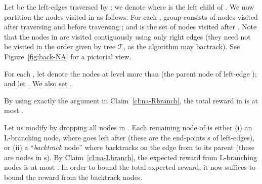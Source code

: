\documentclass[11pt,letterpaper]{article}
\numberwithin{algorithm}{section}
\newcommand{\T}{\ensuremath{\mathcal{T}}\xspace}
\begin{document}
Let  be the left-edges traversed by ; we denote  where  is the left child of . We now partition the nodes visited in  as follows. For each , group  consists of nodes visited after traversing  and before traversing ; and  is the set of nodes visited after . Note that the nodes in  are visited contiguously using only right edges (they need not be visited in the order given by tree \T, as the algorithm may bactrack). See Figure~\ref{fig:back-NA} for a pictorial view.

For each , let  denote the nodes at level more than  (the parent node of left-edge ); and  let . We also set .

By using exactly the argument in Claim~\ref{cl:na-Rbranch}, the total reward in  is at most
.

 Let us modify  by dropping all nodes in .
 Each remaining node  of  is either (i) an L-branching node, where  goes left after  (these are the end-points s of left-edges), or (ii) a ``{\em backtrack} node'' where  backtracks on the edge from  to its parent (these are nodes in s). By Claim~\ref{cl:na-Lbranch}, the expected reward from L-branching nodes is at most . In order to bound the total expected reward, it now suffices to bound the reward from the backtrack nodes.
\end{document}
